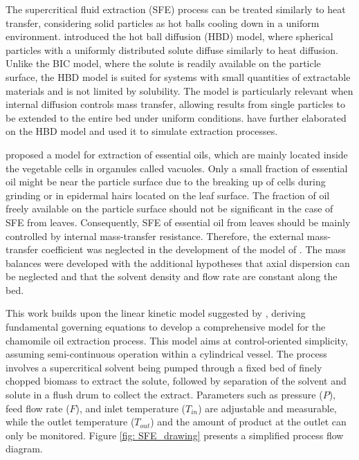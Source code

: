 \documentclass[a4paper,fleqn]{cas-dc}
\begin{document}
	The supercritical fluid extraction (SFE) process can be treated similarly to heat transfer, considering solid particles as hot balls cooling down in a uniform environment. \citet{Bartle1990} introduced the hot ball diffusion (HBD) model, where spherical particles with a uniformly distributed solute diffuse similarly to heat diffusion. Unlike the BIC model, where the solute is readily available on the particle surface, the HBD model is suited for systems with small quantities of extractable materials and is not limited by solubility. The model is particularly relevant when internal diffusion controls mass transfer, allowing results from single particles to be extended to the entire bed under uniform conditions. \citet{Reverchon1993} have further elaborated on the HBD model and used it to simulate extraction processes.
	
	\citet{Reverchon1996} proposed a model for extraction of essential oils, which are mainly located inside the vegetable cells in organules called vacuoles. Only a small fraction of essential oil might be near the particle surface due to the breaking up of cells during grinding or in epidermal hairs located on the leaf surface. The fraction of oil freely available on the particle surface should not be significant in the case of SFE from leaves. Consequently, SFE of essential oil from leaves should be mainly controlled by internal mass-transfer resistance. Therefore, the external mass-transfer coefficient was neglected in the development of the model of \citet{Reverchon1996}. The mass balances were developed with the additional hypotheses that axial dispersion can be neglected and that the solvent density and flow rate are constant along the bed.
	
	This work builds upon the linear kinetic model suggested by \citet{Reverchon1996}, deriving fundamental governing equations to develop a comprehensive model for the chamomile oil extraction process. This model aims at control-oriented simplicity, assuming semi-continuous operation within a cylindrical vessel. The process involves a supercritical solvent being pumped through a fixed bed of finely chopped biomass to extract the solute, followed by separation of the solvent and solute in a flush drum to collect the extract. Parameters such as pressure ($P$), feed flow rate ($F$), and inlet temperature ($T_{in}$) are adjustable and measurable, while the outlet temperature ($T_{out}$) and the amount of product at the outlet can only be monitored. Figure \ref{fig: SFE_drawing} presents a simplified process flow diagram.
	
\end{document}
